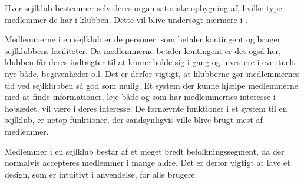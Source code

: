 Hver sejlklub bestemmer selv deres organisatoriske opbygning af, hvilke type medlemmer de har i klubben.
Dette vil blive undersøgt nærmere i . 

Medlemmerne i en sejlklub er de personer, som betaler kontingent og bruger sejlklubbens faciliteter.  
Da medlemmerne betaler kontingent er det også her, klubben får deres indtægter til at kunne holde sig i gang og investere i eventuelt nye både, begivenheder o.l. 
Det er derfor vigtigt, at klubberne gør medlemmernes tid ved sejlklubben så god som mulig. 
Et system der kunne hjælpe medlemmerne med at finde informationer, leje både og som har medlemmernes interesse i højsædet, vil være i deres interesse.
De førnævnte funktioner i et system til en sejlklub, er netop funktioner, der sandsynligvis ville blive brugt mest af medlemmer.

Medlemmer i en sejlklub består af et meget bredt befolkningssegment, da der normalvis accepteres medlemmer i mange aldre.
Det er derfor vigtigt at lave et design, som er intuitivt i anvendelse,  for alle brugere.



